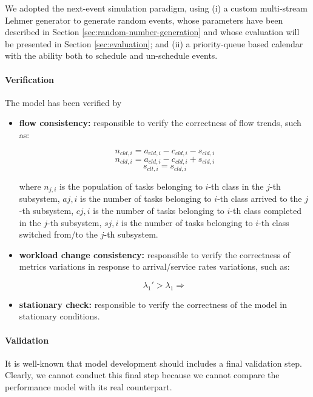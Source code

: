 We adopted the next-event simulation paradigm, using 
(i) a custom multi-stream Lehmer generator to generate random events, whose parameters have been described in Section \ref{sec:random-number-generation} and whose evaluation will be presented in Section \ref{sec:evaluation}; and
(ii) a priority-queue based calendar with the ability both to schedule and un-schedule events.


\paragraph{Verification}
The model has been verified by 
\begin{itemize}
	\item \textbf{flow consistency:} responsible to verify the correctness of flow trends, such as:
	
	\begin{equation}
	n_{cld,i}=a_{cld,i}-c_{cld,i}-s_{cld,i}
	\end{equation}
	\begin{equation}
	n_{cld,i}=a_{cld,i}-c_{cld,i}+s_{cld,i}
	\end{equation}
	\begin{equation}
	s_{clt,i}=s_{cld,i}
	\end{equation}
	
	 where 
	 $n_{j,i}$ is the population of tasks belonging to $i$-th class in the $j$-th subsystem, 
	 $a{j,i}$ is the number of tasks belonging to $i$-th class arrived to the $j$-th subsystem, 
	 $c{j,i}$ is the number of tasks belonging to $i$-th class completed in the $j$-th subsystem, 
	 $s{j,i}$ is the number of tasks belonging to $i$-th class switched from/to the $j$-th subsystem.
	 
	\item \textbf{workload change consistency:} responsible to verify the correctness of metrics variations in response to arrival/service rates variations, such as:
	
	\begin{equation}
		\lambda_{1}' > \lambda_{1} \Rightarrow
	\end{equation}
	
	\item \textbf{stationary check:} responsible to verify the correctness of the model in stationary conditions.
\end{itemize}

\paragraph{Validation}
It is well-known that model development should includes a final validation step. Clearly, we cannot conduct this final step because we cannot compare the performance model with its real counterpart.